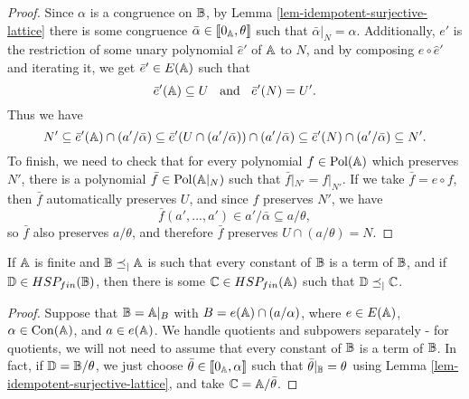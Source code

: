 \begin{appendices}
\begin{proof}
Since $\alpha$ is a congruence on $\mathbb{B}$, by Lemma \ref{lem-idempotent-surjective-lattice} there is some congruence $\bar{\alpha} \in \llbracket 0_{\mathbb{A}}, \theta \rrbracket$ such that $\bar{\alpha}|_N = \alpha$. Additionally, $e'$ is the restriction of some unary polynomial $\hat{e}'$ of $\mathbb{A}$ to $N$, and by composing $e \circ \hat{e}'$ and iterating it, we get $\bar{e}' \in E(\mathbb{A})$ such that
\[
\bar{e}'(\mathbb{A}) \subseteq U \;\; \text{ and } \;\; \bar{e}'(N) = U'.
\]
Thus we have
\[
N' \subseteq \bar{e}'(\mathbb{A}) \cap (a'/\bar{\alpha}) \subseteq \bar{e}'(U \cap (a'/\bar{\alpha})) \cap (a'/\bar{\alpha}) \subseteq \bar{e}'(N) \cap (a'/\bar{\alpha}) \subseteq N'.
\]
To finish, we need to check that for every polynomial $f \in \operatorname{Pol}(\mathbb{A})$ which preserves $N'$, there is a polynomial $\bar{f} \in \operatorname{Pol}(\mathbb{A}|_N)$ such that $\bar{f}|_{N'} = f|_{N'}$. If we take $\bar{f} = e \circ f$, then $\bar{f}$ automatically preserves $U$, and since $f$ preserves $N'$, we have
\[
\bar{f}(a', ..., a') \in a'/\bar{\alpha} \subseteq a/\theta,
\]
so $\bar{f}$ also preserves $a/\theta$, and therefore $\bar{f}$ preserves $U \cap (a/\theta) = N$.
\end{proof}


\begin{prop}\label{prop-restrict-variety} If $\mathbb{A}$ is finite and $\mathbb{B} \preceq_| \mathbb{A}$ is such that every constant of $\mathbb{B}$ is a term of $\mathbb{B}$, and if $\mathbb{D} \in HSP_{fin}(\mathbb{B})$, then there is some $\mathbb{C} \in HSP_{fin}(\mathbb{A})$ such that $\mathbb{D} \preceq_| \mathbb{C}$.
\end{prop}
\begin{proof} Suppose that $\mathbb{B} = \mathbb{A}|_B$ with $B = e(\mathbb{A}) \cap (a/\alpha)$, where $e \in E(\mathbb{A})$, $\alpha \in \operatorname{Con}(\mathbb{A})$, and $a \in e(\mathbb{A})$. We handle quotients and subpowers separately - for quotients, we will not need to assume that every constant of $\mathbb{B}$ is a term of $\mathbb{B}$. In fact, if $\mathbb{D} = \mathbb{B}/\theta$, we just choose $\bar{\theta} \in \llbracket 0_{\mathbb{A}}, \alpha \rrbracket$ such that $\bar{\theta}|_{\mathbb{B}} = \theta$ using Lemma \ref{lem-idempotent-surjective-lattice}, and take $\mathbb{C} = \mathbb{A}/\bar{\theta}$.


\end{proof}
\end{appendices}
